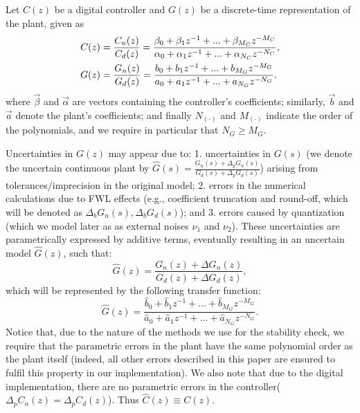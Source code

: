 \documentclass[final]{sig-alternate-05-2015}
\newcommand{\red}[1]{{\color{red}#1}}
\begin{document}
Let $C(z)$ be a digital controller and $G(z)$ be a discrete-time representation of the plant, 
given as
%
\begin{align}
\small
\label{controller_plant_tf}
C(z)&=\frac{C_n(z)}{C_d(z)}=\frac{\beta_{0}+\beta_{1}z^{-1}+...+\beta_{M_C}z^{-M_C}}{\alpha_{0}+\alpha_{1}z^{-1}+...+\alpha_{N_C}z^{-N_C}}, \\
G(z)&=\frac{G_n(z)}{G_d(z)}=\frac{b_{0}+b_{1}z^{-1}+...+b_{M_G}z^{-M_G}}{a_{0}+a_{1}z^{-1}+...+a_{N_G}z^{-N_G}}.
\end{align}
%
where $\vec{\beta}$ and $\vec{\alpha}$ are vectors containing the
controller's coefficients; similarly, $\vec{b}$ and $\vec{a}$ denote the
plant's coefficients; 
and finally $N_{(\cdot)}$ and $M_{(\cdot)}$ indicate the order of the polynomials,  
and we require in particular that $N_G \geq M_G$. 

Uncertainties in $G(z)$ may appear due to: 
1. uncertainties in $G(s)$ (we denote the uncertain continuous plant by $\hat{G}(s)=\frac{G_n(s)+\Delta_p{G}_n(s)}{G_d(s)+\Delta_p{G}_d(s)}$) arising from tolerances/imprecision in the original model; 
2. errors in the numerical calculations due to FWL effects (e.g., coefficient truncation and round-off, which will be denoted as $\Delta_b{G}_n(s),\Delta_b{G}_d(s)$);    
and 
3. errors caused by quantization (which we model later as as external noises $\nu_1$ and $\nu_2$). 
These uncertainties are parametrically expressed by additive terms, eventually resulting in an uncertain model $\hat{G}(z)$, such that:
%
\begin{equation}
\hat{G}(z)=\frac{G_n(z)+\Delta G_n(z)}{G_d(z)+\Delta G_d(z)},
\end{equation}
%
which will be represented by the following transfer function:
%
\begin{equation}
\hat{G}(z)=\frac{\hat{b}_{0}+\hat{b}_{1}z^{-1}+...+\hat{b}_{M_G}z^{-M_G}}{\hat{a}_{0}+\hat{a}_{1}z^{-1}+...+\hat{a}_{N_G}z^{-N_G}}. 
\end{equation}
%
Notice that, due to the nature of the methods we use for the stability check, we require
that the parametric errors in the plant have the same polynomial order as
the plant itself (indeed, all other errors described in this paper are ensured to
fulfil this property in our implementation). 
We also note that due to the digital implementation, there are no parametric errors in the controller($\Delta_pC_n(z)=\Delta_pC_d(z)$). Thus $\hat{C}(z) \equiv C(z)$.
\end{document}
